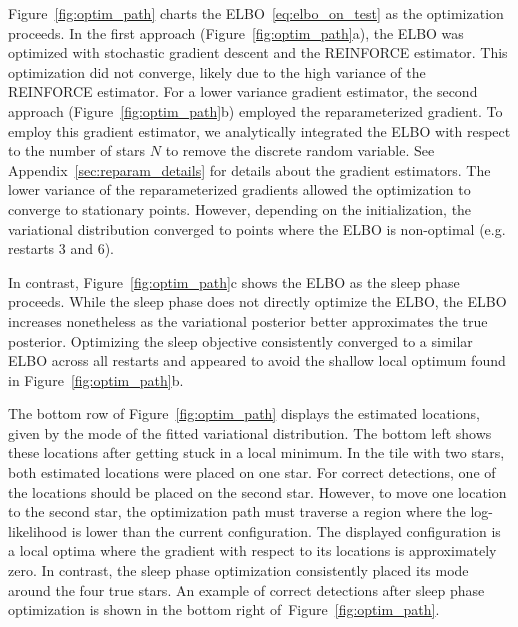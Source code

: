 Figure~\ref{fig:optim_path} charts the ELBO~\eqref{eq:elbo_on_test} as the optimization proceeds.
In the first approach (Figure~\ref{fig:optim_path}a), the ELBO was optimized with stochastic gradient descent and the REINFORCE estimator.
This optimization did not converge, likely due to the high variance of the REINFORCE estimator. 
For a lower variance gradient estimator, the second approach (Figure~\ref{fig:optim_path}b) employed the reparameterized gradient.  To employ this gradient estimator, we analytically integrated the ELBO with respect to the number of stars $N$ to remove the discrete random variable. 
See Appendix~\ref{sec:reparam_details} for details about the gradient estimators. 
The lower variance of the reparameterized gradients allowed the optimization to converge to stationary points. 
However, depending on the initialization, the variational distribution converged to points where the ELBO is non-optimal (e.g. restarts 3 and 6). 

In contrast, Figure~\ref{fig:optim_path}c shows the ELBO as the sleep phase proceeds. 
While the sleep phase does not directly optimize the ELBO, the ELBO increases nonetheless as the variational posterior better approximates the true posterior. 
Optimizing the sleep objective consistently converged to a similar ELBO across all restarts and appeared to avoid the shallow local optimum found in Figure~\ref{fig:optim_path}b.

The bottom row of Figure~\ref{fig:optim_path} displays the estimated locations, given by the mode of the fitted variational distribution. 
The bottom left shows these locations after getting stuck in a local minimum. 
In the tile with two stars, both estimated locations were placed on one star. 
For correct detections, one of the locations should be placed on the second star. 
However, to move one location to the second star, the optimization path must traverse a region where the log-likelihood is lower than the current configuration. 
The displayed configuration is a local optima where the gradient with respect to its locations is approximately zero.
In contrast, the sleep phase optimization consistently placed its mode around the four true stars. 
An example of correct detections after sleep phase optimization is shown in the bottom right of~Figure~\ref{fig:optim_path}.

